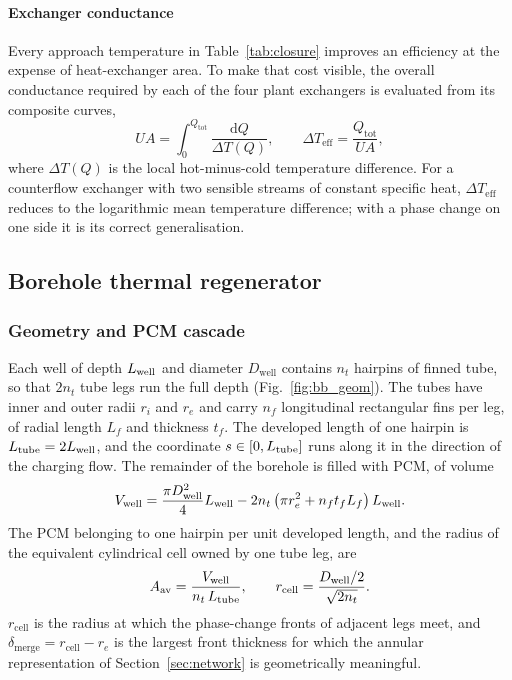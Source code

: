 \paragraph{Exchanger conductance}
Every approach temperature in Table~\ref{tab:closure} improves an efficiency
at the expense of heat-exchanger area. To make that cost visible, the overall
conductance required by each of the four plant exchangers is evaluated from
its composite curves,
\begin{equation}
  UA=\int_{0}^{Q_\mathrm{tot}}\frac{\mathrm{d}Q}{\Delta T(Q)},
  \qquad
  \Delta T_\mathrm{eff}=\frac{Q_\mathrm{tot}}{UA},
  \label{eq:UA}
\end{equation}
where $\Delta T(Q)$ is the local hot-minus-cold temperature difference. For a
counterflow exchanger with two sensible streams of constant specific heat,
$\Delta T_\mathrm{eff}$ reduces to the logarithmic mean temperature
difference; with a phase change on one side it is its correct generalisation.

\subsection{Borehole thermal regenerator}
\label{sec:BB}

\subsubsection{Geometry and PCM cascade}
\label{sec:cascade}

Each well of depth $L_{\mathrm{well}}$ and diameter $D_\mathrm{well}$ contains $n_t$
hairpins of finned tube, so that $2n_t$ tube legs run the full depth
(Fig.~\ref{fig:bb_geom}). The tubes have inner and outer radii $r_i$ and $r_e$
and carry $n_f$ longitudinal rectangular fins per leg, of radial length $L_f$
and thickness $t_f$. The developed length of one hairpin is
$L_{\mathrm{tube}}=2L_{\mathrm{well}}$, and the coordinate $s\in[0,L_{\mathrm{tube}}]$ runs along it in the
direction of the charging flow. The remainder of the borehole is filled with
PCM, of volume
\begin{equation}
  V_{\mathrm{well}}=\frac{\pi D_\mathrm{well}^{2}}{4}L_{\mathrm{well}}
    -2n_t\left(\pi r_e^{2}+n_f t_f L_f\right)L_{\mathrm{well}} .
  \label{eq:Vwell}
\end{equation}
The PCM belonging to one hairpin per unit developed length, and the radius of
the equivalent cylindrical cell owned by one tube leg, are
\begin{equation}
  A_{\mathrm{av}}=\frac{V_{\mathrm{well}}}{n_t\,L_{\mathrm{tube}}},
  \qquad
  r_\mathrm{cell}=\frac{D_\mathrm{well}/2}{\sqrt{2n_t}} .
  \label{eq:Aav}
\end{equation}
$r_\mathrm{cell}$ is the radius at which the phase-change fronts of adjacent
legs meet, and $\delta_\mathrm{merge}=r_\mathrm{cell}-r_e$ is the largest
front thickness for which the annular representation of
Section~\ref{sec:network} is geometrically meaningful.

